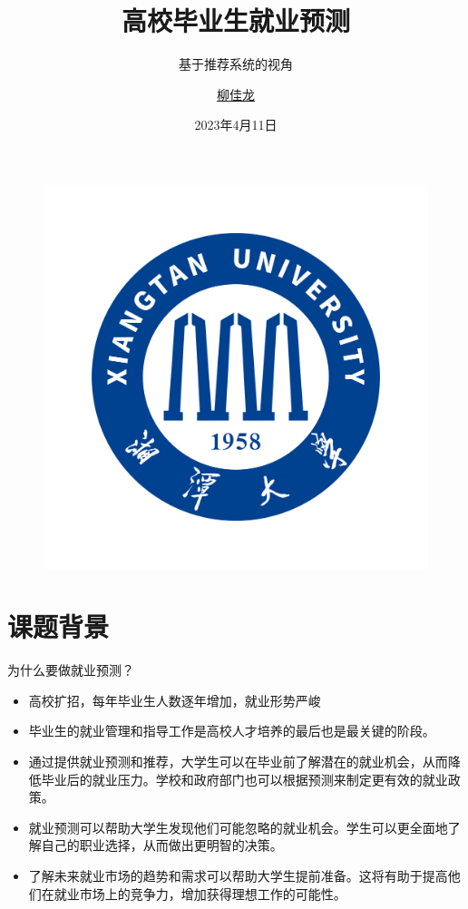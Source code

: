 \documentclass{beamer}
\author{\href{https://github.com/Galleons2029}{柳佳龙}}
\institute{湘潭大学环境与资源学院}
\title{高校毕业生就业预测}
\subtitle{基于推荐系统的视角}
\date{2023年4月11日}
\begin{document}
\kaishu
\begin{frame}
    \titlepage
    \begin{figure}[htpb]
    	\vspace{-0.5cm}
        \begin{center}
            \includegraphics[width=0.3\linewidth]{fig/xtlogo.png}
        \end{center}
    \end{figure}
\end{frame}

\begin{frame}
    \tableofcontents[sectionstyle=show,subsectionstyle=show/shaded/hide,subsubsectionstyle=show/shaded/hide]
\end{frame}


\section{课题背景}

\begin{frame}{为什么要做就业预测？}
    \begin{itemize}[<+-| alert@+>] 
    
        \item 高校扩招，每年毕业生人数逐年增加，就业形势严峻
        \item 毕业生的就业管理和指导工作是高校人才培养的最后也是最关键的阶段。
        \item 通过提供就业预测和推荐，大学生可以在毕业前了解潜在的就业机会，从而降低毕业后的就业压力。学校和政府部门也可以根据预测来制定更有效的就业政策。
        \item 就业预测可以帮助大学生发现他们可能忽略的就业机会。学生可以更全面地了解自己的职业选择，从而做出更明智的决策。
        \item 了解未来就业市场的趋势和需求可以帮助大学生提前准备。这将有助于提高他们在就业市场上的竞争力，增加获得理想工作的可能性。
    \end{itemize}
\end{frame}
\end{document}
